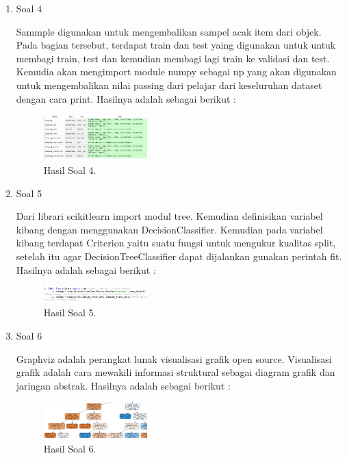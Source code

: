\begin{enumerate}
	\item Soal 4
	\hfill\break
	
	Sammple digunakan untuk mengembalikan sampel acak item dari objek. Pada bagian tersebut, terdapat train dan test yaing digunakan untuk untuk membagi train, test dan kemudian membagi lagi train ke validasi dan test. Kemudia akan mengimport module numpy sebagai np yang akan digunakan untuk mengembalikan nilai passing dari pelajar dari keseluruhan dataset dengan cara print. Hasilnya adalah sebagai berikut :
	\begin{figure}[H]
	\centering
		\includegraphics[width=4cm]{figures/1174008/2/hasilsoal4.PNG}
		\caption{Hasil Soal 4.}
	\end{figure}

	\item Soal 5
	\hfill\break
	
	Dari librari scikitlearn import modul tree. Kemudian definisikan variabel kibang dengan menggunakan DecisionClassifier. Kemudian pada variabel kibang terdapat Criterion yaitu suatu fungsi untuk mengukur kualitas split, setelah itu agar DecisionTreeClassifier dapat dijalankan gunakan perintah fit. Hasilnya adalah sebagai berikut :
	\begin{figure}[H]
	\centering
		\includegraphics[width=4cm]{figures/1174008/2/hasilsoal5.PNG}
		\caption{Hasil Soal 5.}
	\end{figure}

	\item Soal 6
	\hfill\break
	
	Graphviz adalah perangkat lunak visualisasi grafik open source. Visualisasi grafik adalah cara mewakili informasi struktural sebagai diagram grafik dan jaringan abstrak. Hasilnya adalah sebagai berikut :
	\begin{figure}[H]
	\centering
		\includegraphics[width=4cm]{figures/1174008/2/hasilsoal6.PNG}
		\caption{Hasil Soal 6.}
	\end{figure}


\end{enumerate}
